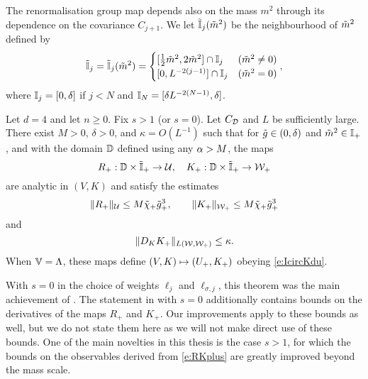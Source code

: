 The renormalisation group map depends also on the mass $m^2$ through its
dependence on the covariance $C_{j+1}$.
We let $\tilde{\mathbb{I}}_j(\tilde{m}^2)$ be the neighbourhood of $\tilde{m}^2$ defined by
\begin{equation}
\lbeq{Itilint}
    \Igen_j = \Igen_j(\mgen^2) =
    \begin{cases}
    [\frac 12 \mgen^2, 2 \mgen^2] \cap \Iint_j & (\mgen^2 \neq 0)
    \\
    [0,L^{-2(j-1)}] \cap \Iint_j & (\mgen^2 =0)
    \end{cases},
\end{equation}
where $\mathbb{I}_j = [0, \delta]$ if $j < N$ and $\mathbb{I}_N = [\delta L^{-2 (N - 1)}, \delta]$.

\begin{theorem}
\label{thm:step-mr-fv}
Let $d = 4$ and let $n \ge 0$. Fix $s > 1$ (or $s = 0$). Let $C_{\mathcal{D}}$ and $L$
be sufficiently large. There exist $M>0$, $\delta >0$,
and $\kappa = O(L^{-1})$											%
such that for $\tilde{g} \in (0,\delta)$
and $\tilde{m}^2 \in \mathbb{I}_+$,											%
and with the domain $\mathbb{D}$ defined using any $\alpha> M$, the maps
\begin{equation}
\label{e:RKplusmaps}
R_+:\domRG \times \Igen_+ %
	\to \Ucal,
		\quad
K_+:\domRG \times \Igen_+ %
	\to \Wcal_{+}%
\end{equation}
are analytic in $(V, K)$											%
and satisfy the estimates
\begin{equation}
\label{e:RKplus}
\|R_+\|_{\mathcal{U}}
	\le
M\tilde{\chi}_+\tilde{g}_+^{3},
	\qquad
\|K_+\|_{\mathcal{W}_+}
	\le
M\tilde{\chi}_+ \tilde{g}_+^{3}
\end{equation}
and
\begin{equation}
\label{e:DKkappa}
\|D_K K_+\|_{L(\mathcal{W},\mathcal{W}_+)} \le \kappa.
\end{equation}
When $\mathbb{V} = \Lambda$, these maps define $(V,K)\mapsto (U_+,K_+)$
obeying \eqref{e:IcircKdu}.
\end{theorem}

With $s = 0$ in the choice of weights $\ell_j$ and $\ell_{\sigma,j}$,
this theorem was the main achievement of \cite{BS-rg-step}.
The statement in \cite{BS-rg-step} with $s = 0$ additionally contains
bounds on the derivatives of the maps $R_+$ and $K_+$. Our improvements
apply to these bounds as well, but we do not state them here as we will
not make direct use of these bounds.
One of the main novelties in this thesis is the case $s > 1$,
for which the bounds on the observables derived from \eqref{e:RKplus}
are greatly improved beyond the mass scale.

